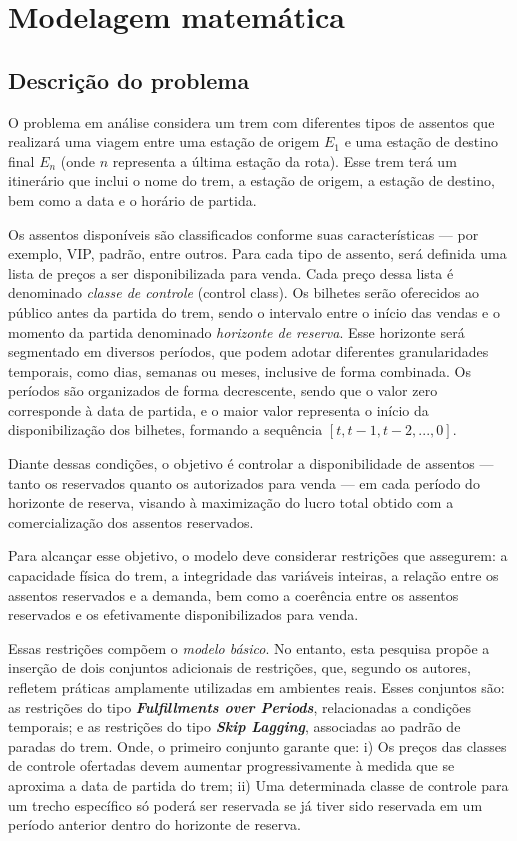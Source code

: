 \chapter{Modelagem matemática }

\section{Descrição do problema}
O problema em análise considera um trem com diferentes tipos de assentos que realizará uma viagem entre uma estação de origem \( E_1 \) e uma estação de destino final \( E_n \) (onde \( n \) representa a última estação da rota). Esse trem terá um itinerário que inclui o nome do trem, a estação de origem, a estação de destino, bem como a data e o horário de partida.

Os assentos disponíveis são classificados conforme suas características — por exemplo, VIP, padrão, entre outros. Para cada tipo de assento, será definida uma lista de preços a ser disponibilizada para venda. Cada preço dessa lista é denominado \textit{classe de controle} (control class). Os bilhetes serão oferecidos ao público antes da partida do trem, sendo o intervalo entre o início das vendas e o momento da partida denominado \textit{horizonte de reserva}. Esse horizonte será segmentado em diversos períodos, que podem adotar diferentes granularidades temporais, como dias, semanas ou meses, inclusive de forma combinada. Os períodos são organizados de forma decrescente, sendo que o valor zero corresponde à data de partida, e o maior valor representa o início da disponibilização dos bilhetes, formando a sequência \( [t, t-1, t-2, ..., 0] \).

Diante dessas condições, o objetivo é controlar a disponibilidade de assentos — tanto os reservados quanto os autorizados para venda — em cada período do horizonte de reserva, visando à maximização do lucro total obtido com a comercialização dos assentos reservados.

Para alcançar esse objetivo, o modelo deve considerar restrições que assegurem: a capacidade física do trem, a integridade das variáveis inteiras, a relação entre os assentos reservados e a demanda, bem como a coerência entre os assentos reservados e os efetivamente disponibilizados para venda.

Essas restrições compõem o \textit{modelo básico}. No entanto, esta pesquisa propõe a inserção de dois conjuntos adicionais de restrições, que, segundo os autores, refletem práticas amplamente utilizadas em ambientes reais. Esses conjuntos são: as restrições do tipo \textbf{ \textit{Fulfillments over Periods}}, relacionadas a condições temporais; e as restrições do tipo \textbf{\textit{Skip Lagging}}, associadas ao padrão de paradas do trem. Onde, o primeiro conjunto garante que: i) Os preços das classes de controle ofertadas devem aumentar progressivamente à medida que se aproxima a data de partida do trem; ii) Uma determinada classe de controle para um trecho específico só poderá ser reservada se já tiver sido reservada em um período anterior dentro do horizonte de reserva.

